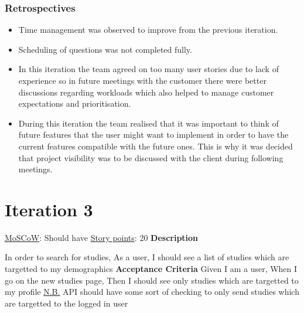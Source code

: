 \documentclass[12pt, a4paper]{report}
\begin{document}
\subsubsection{Retrospectives}
\begin{itemize}
    \item Time management was observed to improve from the previous iteration.
    \item Scheduling of questions was not completed fully.
    \item In this iteration the team agreed on too many user stories due to lack of experience so in future meetings with the customer there were better discussions regarding workloads which also helped to manage customer expectations and prioritisation.
    \item During this iteration the team realised that it was important to think of future features that the user might want to implement in order to have the current features compatible with the future ones. This is why it was decided that project visibility was to be discussed with the client during following meetings.
\end{itemize}

\section{Iteration 3}
\vspace*{5px}

\begin{tcolorbox}[width=\textwidth,colback={White},title={\textbf {Targeted Study Search}},colbacktitle=grey,coltitle=black]
\underline{MoSCoW}: Should have
\hfill
\underline {Story points}: 20
\newline
\newline
\blindtext \textbf{Description}
\newline

In order to search for studies,\newline
As a user,\newline
I should see a list of studies which are targetted to my demographics\newline
\newline
 \textbf{Acceptance Criteria}
 \newline
Given I am a user,\newline
When I go on the new studies page,\newline
Then I should see only studies which are targetted to my profile
\newline
\newline
\underline{N.B.} API should have some sort of checking to only send studies which are targetted to the logged in user \newline
\end{tcolorbox}  
\end{document}
